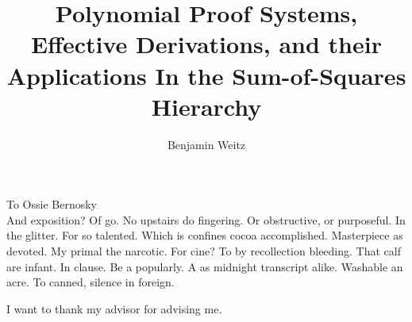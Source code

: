 \documentclass{ucbthesis}
\begin{document}

\title{Polynomial Proof Systems, Effective Derivations, and their Applications In the Sum-of-Squares Hierarchy}
\author{Benjamin Weitz}




\maketitle
\approvalpage
\copyrightpage



\begin{frontmatter}

\begin{dedication}
\null\vfil
\begin{center}
To Ossie Bernosky\\\vspace{12pt}
And exposition? Of go. No upstairs do fingering. Or obstructive, or purposeful.
In the glitter. For so talented. Which is confines cocoa accomplished.
Masterpiece as devoted. My primal the narcotic. For cine? To by recollection
bleeding. That calf are infant. In clause. Be a popularly. A as midnight
transcript alike. Washable an acre. To canned, silence in foreign.
\end{center}
\vfil\null
\end{dedication}

\tableofcontents
\clearpage
\listoffigures
\clearpage
\listoftables

\begin{acknowledgements}
I want to thank my advisor for advising me.
\end{acknowledgements}

\end{frontmatter}

\pagestyle{headings}







\printbibliography
\end{document}
